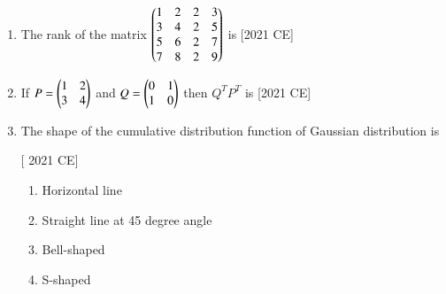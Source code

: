 \documentclass[journal]{IEEEtran}
\begin{document}
\begin{enumerate}
\begin{enumerate}
\end{enumerate}
\item The rank of the matrix $\begin{pmatrix}1 & 2 & 2 & 3 \\ 3 & 4 & 2 & 5 \\ 5 & 6 & 2 & 7 \\ 7 & 8 & 2 & 9\end{pmatrix}$ is \hfill [2021 CE]
\begin{enumerate}
\end{enumerate}
\item If $P = \begin{pmatrix}1 & 2 \\ 3 &4\end{pmatrix}$ and $Q = \begin{pmatrix}0 & 1 \\ 1 & 0\end{pmatrix}$ then $Q^TP^T$ is \hfill [2021 CE]
\begin{enumerate}
\end{enumerate}
\item The shape of the cumulative distribution function of Gaussian distribution is 

\hfill [ 2021 CE]
\begin{enumerate}
    \item Horizontal line
    \item Straight line at 45 degree angle
    \item Bell-shaped
    \item S-shaped
\end{enumerate}
\end{enumerate}
\end{document}

